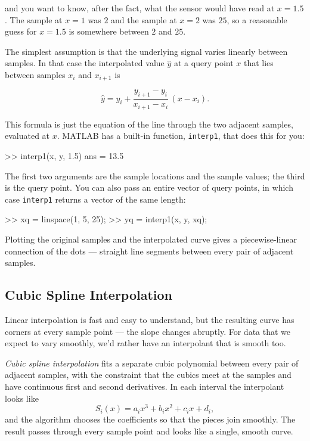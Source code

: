 \documentclass[../../book.tex]{subfiles}
\begin{document}
\noindent and you want to know, after the fact, what the sensor would have read at $x = 1.5$.  The sample at $x=1$ was $2$ and the sample at $x=2$ was $25$, so a reasonable guess for $x=1.5$ is somewhere between $2$ and $25$.

The simplest assumption is that the underlying signal varies linearly between samples.  In that case the interpolated value $\hat{y}$ at a query point $x$ that lies between samples $x_i$ and $x_{i+1}$ is

\begin{equation*}
    \hat{y} = y_i + \frac{y_{i+1} - y_i}{x_{i+1} - x_i}\,(x - x_i).
\end{equation*}

This formula is just the equation of the line through the two adjacent samples, evaluated at $x$.  MATLAB has a built-in function, \lstinline{interp1}, that does this for you:

\begin{code}
>> interp1(x, y, 1.5)
ans = 13.5
\end{code}

The first two arguments are the sample locations and the sample values; the third is the query point.  You can also pass an entire vector of query points, in which case \lstinline{interp1} returns a vector of the same length:

\begin{code}
>> xq = linspace(1, 5, 25);
>> yq = interp1(x, y, xq);
\end{code}

Plotting the original samples and the interpolated curve gives a piecewise-linear connection of the dots --- straight line segments between every pair of adjacent samples.

\subsection{Cubic Spline Interpolation}


Linear interpolation is fast and easy to understand, but the resulting curve has corners at every sample point --- the slope changes abruptly.  For data that we expect to vary smoothly, we'd rather have an interpolant that is smooth too.

\emph{Cubic spline interpolation} fits a separate cubic polynomial between every pair of adjacent samples, with the constraint that the cubics meet at the samples and have continuous first and second derivatives.  In each interval the interpolant looks like
\begin{equation*}
    S_i(x) = a_i x^3 + b_i x^2 + c_i x + d_i,
\end{equation*}
and the algorithm chooses the coefficients so that the pieces join smoothly.  The result passes through every sample point and looks like a single, smooth curve.
\end{document}
